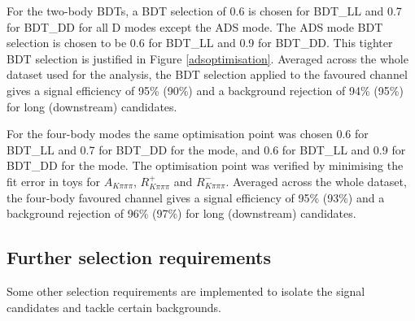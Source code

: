 For the two-body BDTs, a BDT selection of 0.6 is chosen for BDT\_LL and 0.7 for BDT\_DD for all D modes except the ADS mode. The ADS mode BDT selection is chosen to be 0.6 for BDT\_LL and 0.9 for BDT\_DD. This tighter BDT selection is justified in Figure \ref{adsoptimisation}. Averaged across the whole dataset used for the analysis, the BDT selection applied to the favoured \decay{\Bm}{\D(\Km\pip)\Kstarm} channel gives a signal efficiency of 95\% (90\%) and a background rejection of 94\% (95\%) for long (downstream) candidates. 

For the four-body modes the same optimisation point was chosen 0.6 for BDT\_LL and 0.7 for BDT\_DD for the \decay{\Dz}{\Kp\pim\pip\pim} \decay{\Dz}{\pi\pi\pi\pi} mode, and 0.6 for BDT\_LL and 0.9 for BDT\_DD for the \decay{\Dz}{\Kp\pim\pip\pim} mode. The optimisation point was verified by minimising the fit error in toys for $A_{K\pi\pi\pi}$, $R^+_{K\pi\pi\pi}$ and $R^-_{K\pi\pi\pi}$. Averaged across the whole dataset, the four-body favoured \decay{\Bm}{\D(\Km\pip\pim\pip)\Kstarm} channel gives a signal efficiency of 95\% (93\%) and a background rejection of 96\% (97\%) for long (downstream) candidates.


\subsection{Further selection requirements}

Some other selection requirements are implemented to isolate the signal candidates and tackle certain backgrounds.

